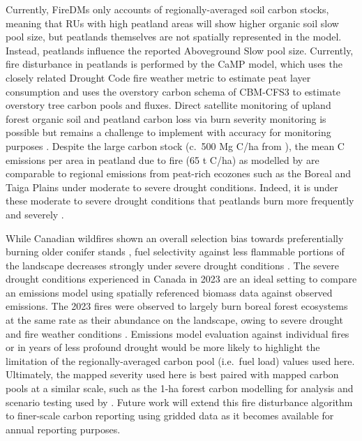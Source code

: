 \documentclass[, manuscript]{copernicus}
\begin{document}
Currently, FireDMs only accounts of regionally-averaged soil carbon
stocks, meaning that RUs with high peatland areas will show higher
organic soil slow pool size, but peatlands themselves are not spatially
represented in the model. Instead, peatlands influence the reported
Aboveground Slow pool size. Currently, fire disturbance in peatlands is
performed by the CaMP model, which uses the closely related Drought Code
fire weather metric to estimate peat layer consumption \citep{bona2020}
and uses the overstory carbon schema of CBM-CFS3 to estimate overstory
tree carbon pools and fluxes. Direct satellite monitoring of upland
forest organic soil and peatland carbon loss via burn severity
monitoring is possible but remains a challenge to implement with
accuracy for monitoring purposes \citep{bourgeau-chavez2020}. Despite
the large carbon stock (c.~500 Mg C/ha from
\citet{beilmanPeatCarbonStocks2008}), the mean C emissions per area in
peatland due to fire (65 t C/ha) as modelled by \citet{bona2024} are
comparable to regional emissions from peat-rich ecozones such as the
Boreal and Taiga Plains under moderate to severe drought conditions.
Indeed, it is under these moderate to severe drought conditions that
peatlands burn more frequently \citep{turetsky2004, thompson2019} and
severely \citep{kuntzemann2023}.

While Canadian wildfires shown an overall selection bias towards
preferentially burning older conifer stands \citep{bernier2016}, fuel
selectivity against less flammable portions of the landscape decreases
strongly under severe drought conditions \citep{parks2018}. The severe
drought conditions experienced in Canada in 2023
\citep{jainDriversImpactsRecordBreaking2024} are an ideal setting to
compare an emissions model using spatially referenced biomass data
against observed emissions. The 2023 fires were observed to largely burn
boreal forest ecosystems at the same rate as their abundance on the
landscape, owing to severe drought and fire weather conditions
\citep{boulanger2024}. Emissions model evaluation against individual
fires or in years of less profound drought would be more likely to
highlight the limitation of the regionally-averaged carbon pool
(i.e.~fuel load) values used here. Ultimately, the mapped severity used
here is best paired with mapped carbon pools at a similar scale, such as
the 1-ha forest carbon modelling for analysis and scenario testing used
by \citet{smyth2024}. Future work will extend this fire disturbance
algorithm to finer-scale carbon reporting using gridded data as it
becomes available for annual reporting purposes.
\end{document}
